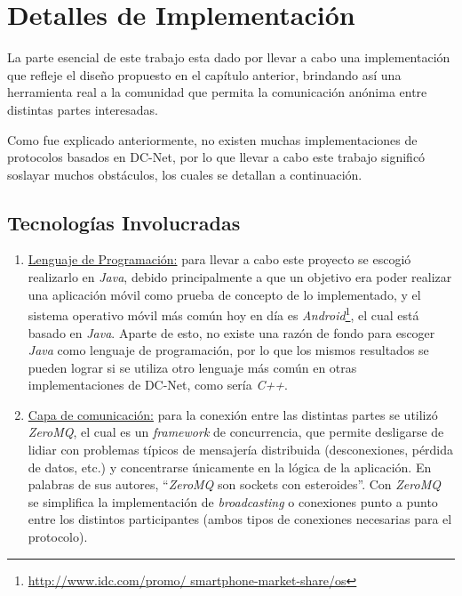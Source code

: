 \chapter{Detalles de Implementación}\label{cap4}

La parte esencial de este trabajo esta dado por llevar a cabo una 
implementación que refleje el diseño propuesto en el capítulo anterior, 
brindando así una herramienta real a la comunidad que permita la comunicación 
anónima entre distintas partes interesadas.

Como fue explicado anteriormente, no existen muchas implementaciones de 
protocolos basados en DC-Net, por lo que llevar a cabo este trabajo significó 
soslayar muchos obstáculos, los cuales se detallan a continuación.

\section{Tecnologías Involucradas}

\begin{enumerate}
    \item \underline{Lenguaje de Programación:} para llevar a cabo este 
    proyecto se escogió realizarlo en \emph{Java}, debido principalmente a que 
    un objetivo era poder realizar una aplicación móvil como prueba de 
    concepto de lo implementado, y el sistema operativo móvil más común hoy en 
    día es \emph{Android}\footnote{\url{http://www.idc.com/promo/
    smartphone-market-share/os}}, el 
    cual está basado en \emph{Java}. Aparte de esto, no existe una razón de 
    fondo para escoger \emph{Java} como lenguaje de programación, por lo que 
    los mismos resultados se pueden lograr si se utiliza otro 
    lenguaje más común en otras implementaciones de DC-Net, como sería \emph{
    C++}.

    \item \underline{Capa de comunicación:} para la conexión entre las 
    distintas partes se utilizó \emph{ZeroMQ}, el cual es un \emph{framework} 
    de concurrencia, que permite desligarse de lidiar con problemas típicos de 
    mensajería distribuida (desconexiones, pérdida de datos, etc.) y 
    concentrarse únicamente en la lógica de la aplicación. En palabras de sus 
    autores, ``\emph{ZeroMQ} son sockets con esteroides''. Con \emph{ZeroMQ} 
    se simplifica la implementación de \emph{broadcasting} o conexiones punto 
    a punto entre los distintos participantes (ambos tipos de conexiones 
    necesarias para el protocolo).
\end{enumerate}

